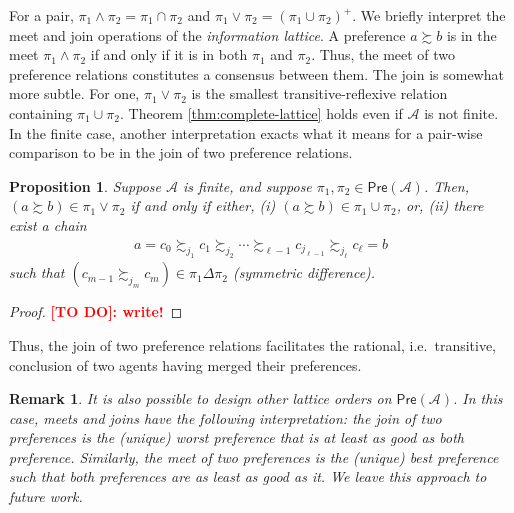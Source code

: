 \documentclass[conference]{ieeeconf}
\newcommand{\A}{\mathcal{A}}
\newcommand{\Pref}{\mathsf{Pre}}
\newcommand{\prefers}{\succsim}
\newcommand{\join}{\vee}
\newcommand{\meet}{\wedge}
\newtheorem{proposition}{Proposition}
\newtheorem{remark}{Remark}
\begin{document}
For a pair, $\pi_1 \meet \pi_2 = \pi_1 \cap \pi_2$ and $\pi_1 \join \pi_2 = \left( \pi_1 \cup \pi_2 \right)^{+}$. We briefly interpret the meet and join operations of the \emph{information lattice}. A preference $a \prefers b$ is in the meet $\pi_1 \meet \pi_2$ if and only if it is in both $\pi_1$ and $\pi_2$. Thus, the meet of two preference relations constitutes a consensus between them. The join is somewhat more subtle. For one, $\pi_1 \join \pi_2$ is the smallest transitive-reflexive relation containing $\pi_1 \cup \pi_2$. Theorem \ref{thm:complete-lattice} holds even if $\A$ is not finite. In the finite case, another interpretation exacts what it means for a pair-wise comparison to be in the join of two preference relations.
\begin{proposition} \label{prop:join}
    Suppose $\A$ is finite, and suppose $\pi_1, \pi_2 \in \Pref(\A)$. Then, $(a \prefers b) \in \pi_1 \join \pi_2$ if and only if either, (i) $(a \prefers b) \in \pi_1 \cup \pi_2$, or, (ii) there exist a chain
    \begin{align}
        a = c_0 \prefers_{j_1} c_1 \prefers_{j_2}  \cdots \prefers_{\ell-1} c_{j_{\ell-1}} \prefers_{j_\ell} c_{\ell} = b \label{eq:chain}
    \end{align}
    such that $\left( c_{m-1} \prefers_{{j_m}} c_{m} \right) \in \pi_1 \Delta \pi_2$ (symmetric difference).
\end{proposition}
\begin{proof}
    \textcolor{red}{\bf [TO DO]: write!}
\end{proof}

Thus, the join of two preference relations facilitates the rational, i.e.~transitive, conclusion of two agents having merged their preferences.

\begin{remark}
    It is also possible to design other lattice orders on $\Pref(\A)$. In this case, meets and joins have the following interpretation: the join of two preferences is the (unique) worst preference that is at least as good as both preference. Similarly, the meet of two preferences is the (unique) best preference such that both preferences are as least as good as it. We leave this approach to future work.
\end{remark}
\end{document}
